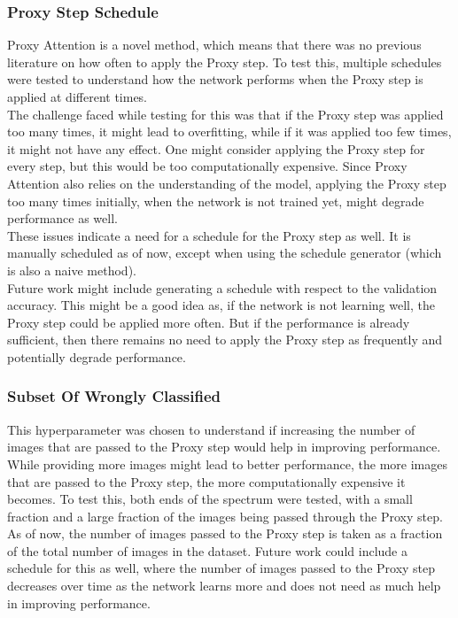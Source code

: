 
\subsubsection{Proxy Step Schedule}
Proxy Attention is a novel method, which means that there was no previous literature on how often to apply the Proxy step. To test this, multiple schedules were tested to understand how the network performs when the Proxy step is applied at different times.\\
The challenge faced while testing for this was that if the Proxy step was applied too many times, it might lead to overfitting, while if it was applied too few times, it might not have any effect. One might consider applying the Proxy step for every step, but this would be too computationally expensive. Since Proxy Attention also relies on the understanding of the model, applying the Proxy step too many times initially, when the network is not trained yet, might degrade performance as well.\\
These issues indicate a need for a schedule for the Proxy step as well. It is manually scheduled as of now, except when using the schedule generator (which is also a naive method).\\
Future work might include generating a schedule with respect to the validation accuracy. This might be a good idea as, if the network is not learning well, the Proxy step could be applied more often. But if the performance is already sufficient, then there remains no need to apply the Proxy step as frequently and potentially degrade performance.


\subsubsection{Subset Of Wrongly Classified}
This hyperparameter was chosen to understand if increasing the number of images that are passed to the Proxy step would help in improving performance. While providing more images might lead to better performance, the more images that are passed to the Proxy step, the more computationally expensive it becomes. To test this, both ends of the spectrum were tested, with a small fraction and a large fraction of the images being passed through the Proxy step.\\
As of now, the number of images passed to the Proxy step is taken as a fraction of the total number of images in the dataset. Future work could include a schedule for this as well, where the number of images passed to the Proxy step decreases over time as the network learns more and does not need as much help in improving performance.

